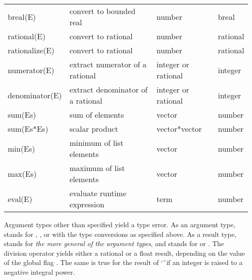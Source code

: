 {\begin{tabular}{l l l l}
breal(E)   & convert to bounded real & number & breal \\
rational(E)   & convert to rational & number & rational \\
rationalize(E) & convert to rational & number & rational \\
numerator(E)   & extract numerator of a  rational & integer or rational &
                 integer \\
denominator(E)   & extract denominator of a rational & integer or rational &
                   integer \\
sum(Es)   & sum of elements & vector & number \\
sum(Es*Es) & scalar product & vector*vector & number \\
min(Es)   & minimum of list elements & vector & number \\
max(Es)   & maximum of list elements & vector & number \\
eval(E)   & evaluate runtime expression & term & number \\
\end{tabular}
}
\vspace{2mm}
\vfill       %
\pagebreak   %

\noindent
Argument types other than specified yield a type error.
As an argument type,  stands for ,
,  or  with the type conversions as
specified above.
As a result type,  stands for
\emph{the more general of the argument types}, and  stands for
 or .
The division operator \notation{/} yields either a rational or a float result,
depending on the value of the global flag
.%
The same is true for the result of \char`\^\ if an integer is raised to
a negative integral power.

